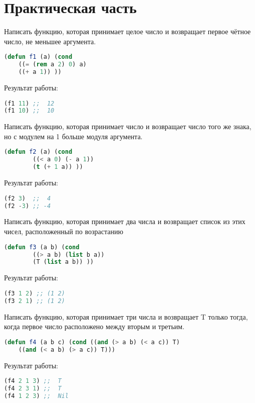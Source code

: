 \documentclass[a4paper,oneside,12pt]{extreport}
\begin{document}


\section*{Практическая часть}

\begin{task}
	Написать функцию, которая принимает целое число и возвращает первое чётное число, не меньшее аргумента.

	\begin{lstlisting}[language=Lisp]
(defun f1 (a) (cond  
	((= (rem a 2) 0) a) 
	((+ a 1)) ))
	\end{lstlisting}

	Результат работы:
	\begin{lstlisting}[language=Lisp]
(f1 11) ;;  12
(f1 10) ;;  10
	\end{lstlisting}
\end{task}


\begin{task}
	Написать функцию, которая принимает число и возвращает число того же знака, но с модулем на 1 больше модуля аргумента.

	\begin{lstlisting}[language=Lisp]
(defun f2 (a) (cond 
		((< a 0) (- a 1)) 
		(t (+ 1 a)) ))
	\end{lstlisting}

	Результат работы:
	\begin{lstlisting}[language=Lisp]
(f2 3)  ;;  4
(f2 -3) ;; -4
	\end{lstlisting}
\end{task}

\begin{task}
	Написать функцию, которая принимает два числа и возвращает список из этих чисел, расположенный по возрастанию

	\begin{lstlisting}[language=Lisp]
(defun f3 (a b) (cond 
		((> a b) (list b a))
		(T (list a b)) ))
	\end{lstlisting}

	Результат работы:
	\begin{lstlisting}[language=Lisp]
(f3 1 2) ;; (1 2)
(f3 2 1) ;; (1 2)
	\end{lstlisting}
\end{task}

\begin{task}
	Написать функцию, которая принимает три числа и возвращает T только тогда, когда первое число расположено между вторым и третьим.

	\begin{lstlisting}[language=Lisp]
(defun f4 (a b c) (cond ((and (> a b) (< a c)) T)
	((and (< a b) (> a c)) T)))
	\end{lstlisting}

	Результат работы:
	\begin{lstlisting}[language=Lisp]
(f4 2 1 3) ;;  T
(f4 2 3 1) ;;  T
(f4 1 2 3) ;;  Nil	
	\end{lstlisting}
\end{task}
\end{document}
